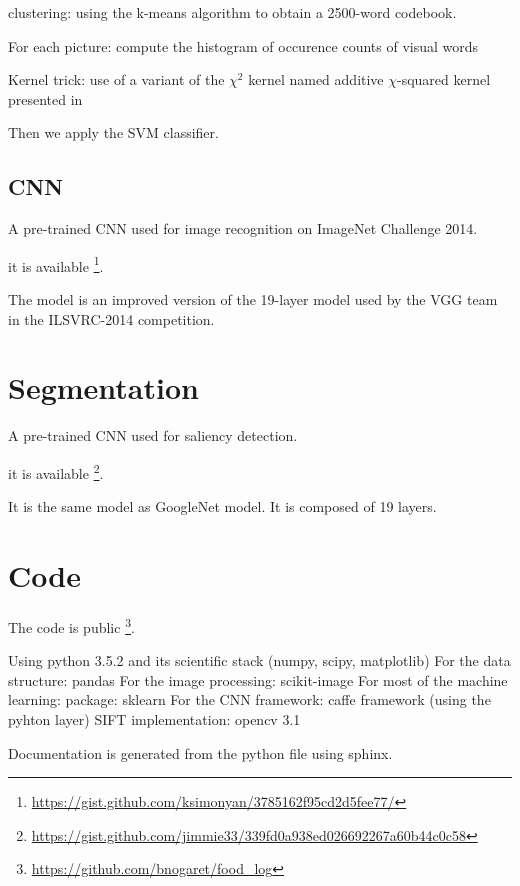 clustering: using the k-means algorithm to obtain a 2500-word codebook.

For each picture:
compute the histogram of occurence counts of visual words

Kernel trick: use of a variant of the $\chi^2$ kernel named additive $\chi$-squared kernel presented in \cite{Vedaldi2010}

Then we apply the SVM classifier.

\subsection{CNN}

A pre-trained CNN used for image recognition on ImageNet Challenge 2014.

\cite{Simonyan2014}

it is available \footnote{\url{https://gist.github.com/ksimonyan/3785162f95cd2d5fee77/}}.

The model is an improved version of the 19-layer model used by the VGG team in the ILSVRC-2014 competition.

\section{Segmentation}

A pre-trained CNN used for saliency detection.

\cite{zhang2015SOD}

it is available \footnote{\url{https://gist.github.com/jimmie33/339fd0a938ed026692267a60b44c0c58}}.

It is the same model as GoogleNet model. It is composed of 19 layers.

\section{Code}

The code is public \footnote{\url{https://github.com/bnogaret/food_log}}.

Using python 3.5.2 and its scientific stack (numpy, scipy, matplotlib)
For the data structure: pandas \cite{McKinney2010}
For the image processing: scikit-image \cite{VanderWalt2014}
For most of the machine learning: package: sklearn \cite{Pedregosa2012}
For the CNN framework: caffe framework \cite{Jia2014a} (using the pyhton layer)
SIFT implementation: opencv 3.1 \cite{Bradski2000}

Documentation is generated from the python file using sphinx.
